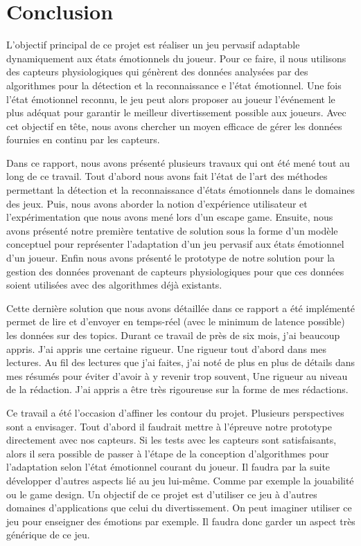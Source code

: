 \documentclass{article}
\begin{document}
\section{Conclusion}
	L'objectif principal de ce projet est réaliser un jeu pervasif adaptable dynamiquement aux états émotionnels du joueur.
	Pour ce faire, il nous utilisons des capteurs physiologiques qui génèrent des données analysées par des algorithmes pour la détection et la reconnaissance e l'état émotionnel.
	Une fois l'état émotionnel reconnu, le jeu peut alors proposer au joueur l'événement le plus adéquat pour garantir le meilleur divertissement possible aux joueurs.
	Avec cet objectif en tête, nous avons chercher un moyen efficace de gérer les données fournies en continu par les capteurs.\par
	Dans ce rapport, nous avons présenté plusieurs travaux qui ont été mené tout au long de ce travail.
	Tout d'abord nous avons fait l'état de l'art des méthodes permettant la détection et la reconnaissance d'états émotionnels dans le domaines des jeux.
	Puis, nous avons aborder la notion d'expérience utilisateur et l'expérimentation que nous avons mené lors d'un escape game.
	Ensuite, nous avons présenté notre première tentative de solution sous la forme d'un modèle conceptuel pour représenter l'adaptation d'un jeu pervasif aux états émotionnel d'un joueur.
	Enfin nous avons présenté le prototype de notre solution pour la gestion des données provenant de capteurs physiologiques pour que ces données soient utilisées avec des algorithmes déjà existants.\par
	Cette dernière solution que nous avons détaillée dans ce rapport a été implémenté permet de lire et d'envoyer en temps-réel (avec le minimum de latence possible) les données sur des topics.
	Durant ce travail de près de six mois, j'ai beaucoup appris.
	J'ai appris une certaine rigueur.
	Une rigueur tout d'abord dans mes lectures.
	Au fil des lectures que j'ai faites, j'ai noté de plus en plus de détails dans mes résumés pour éviter d'avoir à y revenir trop souvent,
	Une rigueur au niveau de la rédaction.
	J'ai appris a être très rigoureuse sur la forme de mes rédactions.\par
	Ce travail a été l'occasion d'affiner les contour du projet.
	Plusieurs perspectives sont a envisager.
	Tout d'abord il faudrait mettre à l'épreuve notre prototype directement avec nos capteurs.
	Si les tests avec les capteurs sont satisfaisants, alors il sera possible de passer à l'étape de la conception d'algorithmes pour l'adaptation selon l'état émotionnel courant du joueur.
	Il faudra par la suite développer d'autres aspects lié au jeu lui-même.
	Comme par exemple la jouabilité ou le game design.
	Un objectif de ce projet est d'utiliser ce jeu à d'autres domaines d'applications que celui du divertissement.
	On peut imaginer utiliser ce jeu pour enseigner des émotions par exemple.
	Il faudra donc garder un aspect très générique de ce jeu.
\end{document}

